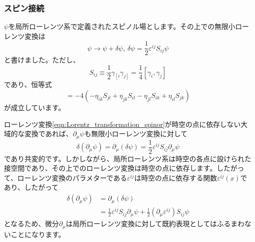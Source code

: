 \documentclass[unicode,a4paper,11pt]{ltjsarticle}
\begin{document}
\subsubsection*{スピン接続}

$\psi$を局所ローレンツ系で定義されたスピノル場とします。その上での無限小ローレンツ変換は
\begin{equation}
   \psi
   \longrightarrow
   \psi+\delta\psi
   ,\
   \delta\psi
   =
   \frac{1}{2}\varepsilon^{ij}S_{ij}\psi
   \label{eqn:Lorentz_transformation_spinor}
\end{equation}
と書けました。ただし、
\begin{equation}
   S_{ij}
   \equiv
   \frac{1}{2}\gamma_{\left[\right.i}
   \gamma_{j\left.\right]}
   =
   \frac{1}{4}[\gamma_{i},\gamma_{j}]
\end{equation}
であり、恒等式
\begin{equation}
   [S_{ij},\ S_{kl}]
   =
   -4
   \left(
   -\eta_{ik}S_{jl}
   +\eta_{jk}S_{il}
   -\eta_{jl}S_{ik}
   +\eta_{il}S_{jk}
   \right)
   \label{eqn:2_6}
\end{equation}
が成立しています。

ローレンツ変換\eqref{eqn:Lorentz_transformation_spinor}が時空の点に依存しない大域的な変換であれば、$\partial_{\mu}\psi$も無限小ローレンツ変換に対して
\begin{equation}
   \delta(\partial_{\mu}\psi)
   =
   \partial_{\mu}(\delta \psi)
   =
   \frac{1}{2}\varepsilon^{ij}S_{ij}\partial_{\mu}\psi
\end{equation}
であり共変的です。しかしながら、局所ローレンツ系は時空の各点に設けられた接空間であり、その上でのローレンツ変換は時空の点に依存します。したがって、ローレンツ変換のパラメターである$\varepsilon^{ij}$は時空の点に依存する関数$\varepsilon^{ij}(x)$であり、したがって
\begin{align}
   \delta(\partial_{\mu}\psi)
    & =
   \partial_{\mu}(\delta \psi)
   \nonumber
   \\
    & =
   \frac{1}{2}\varepsilon^{ij}S_{ij}\partial_{\mu}\psi
   +
   \frac{1}{2}(\partial_{\mu}\varepsilon^{ij})S_{ij}\psi
\end{align}
となるため、微分$\partial_{\mu}$は局所ローレンツ変換に対して既約表現としてはふるまわないことになります。
\end{document}
